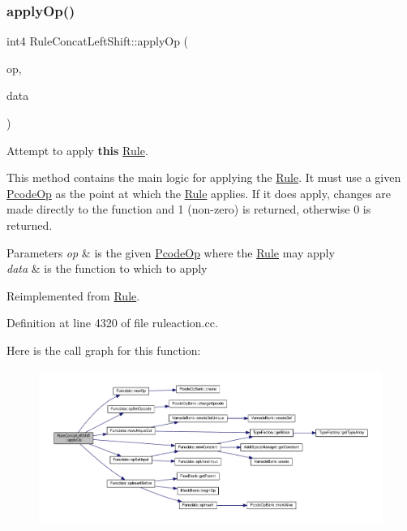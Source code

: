 \subsubsection{\texorpdfstring{applyOp()}{applyOp()}}
{\footnotesize\ttfamily int4 Rule\+Concat\+Left\+Shift\+::apply\+Op (\begin{DoxyParamCaption}\item[{\mbox{\hyperlink{class_pcode_op}{Pcode\+Op}} $\ast$}]{op,  }\item[{\mbox{\hyperlink{class_funcdata}{Funcdata}} \&}]{data }\end{DoxyParamCaption})\hspace{0.3cm}{\ttfamily [virtual]}}



Attempt to apply {\bfseries{this}} \mbox{\hyperlink{class_rule}{Rule}}. 

This method contains the main logic for applying the \mbox{\hyperlink{class_rule}{Rule}}. It must use a given \mbox{\hyperlink{class_pcode_op}{Pcode\+Op}} as the point at which the \mbox{\hyperlink{class_rule}{Rule}} applies. If it does apply, changes are made directly to the function and 1 (non-\/zero) is returned, otherwise 0 is returned. 
\begin{DoxyParams}{Parameters}
{\em op} & is the given \mbox{\hyperlink{class_pcode_op}{Pcode\+Op}} where the \mbox{\hyperlink{class_rule}{Rule}} may apply \\
\hline
{\em data} & is the function to which to apply \\
\hline
\end{DoxyParams}


Reimplemented from \mbox{\hyperlink{class_rule_a4e3e61f066670175009f60fb9dc60848}{Rule}}.



Definition at line 4320 of file ruleaction.\+cc.

Here is the call graph for this function\+:
\nopagebreak
\begin{figure}[H]
\begin{center}
\leavevmode
\includegraphics[width=350pt]{class_rule_concat_left_shift_aca7e943a778d99122e5d3c18f5d77f8f_cgraph}
\end{center}
\end{figure}
\mbox{\label{class_rule_concat_left_shift_a45bbbdffb4920db4a0bf043cdfd6783c}} 
